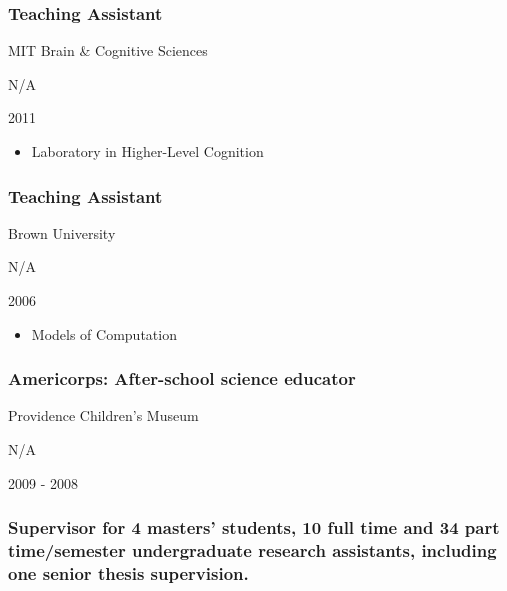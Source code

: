 \documentclass[
]{article}
\providecommand{\tightlist}{%
  \setlength{\itemsep}{0pt}\setlength{\parskip}{0pt}}
\begin{document}
\hypertarget{teaching-assistant-1}{%
\subsubsection{Teaching Assistant}\label{teaching-assistant-1}}

MIT Brain \& Cognitive Sciences

N/A

2011

\begin{itemize}
\tightlist
\item
  Laboratory in Higher-Level Cognition
\end{itemize}

\hypertarget{teaching-assistant-2}{%
\subsubsection{Teaching Assistant}\label{teaching-assistant-2}}

Brown University

N/A

2006

\begin{itemize}
\tightlist
\item
  Models of Computation
\end{itemize}

\hypertarget{americorps-after-school-science-educator}{%
\subsubsection{Americorps: After-school science
educator}\label{americorps-after-school-science-educator}}

Providence Children's Museum

N/A

2009 - 2008

\hypertarget{supervisor-for-4-masters-students-10-full-time-and-34-part-timesemester-undergraduate-research-assistants-including-one-senior-thesis-supervision.}{%
\subsubsection{Supervisor for 4 masters' students, 10 full time and 34
part time/semester undergraduate research assistants, including one
senior thesis
supervision.}\label{supervisor-for-4-masters-students-10-full-time-and-34-part-timesemester-undergraduate-research-assistants-including-one-senior-thesis-supervision.}}
\end{document}
